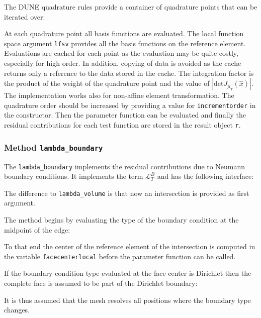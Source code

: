 \documentclass[a4paper,12pt]{article}
\begin{document}
The DUNE quadrature rules provide a container of quadrature points that
can be iterated over:

At each quadrature point all basis functions are evaluated. The local
function space argument \lstinline{lfsv} provides all the basis functions on the
reference element. Evaluations are cached for each point as the evaluation
may be quite costly, especially for high order. In addition, copying of data is
avoided as the cache returns only a reference to the data stored in the cache.
The integration factor is the product of the weight of the quadrature point
and the value of $|\text{det} J_{\mu_T}(\hat x)|$. The implementation works also
for non-affine element transformation. The quadrature order should be increased
by providing a value for \lstinline{incrementorder} in the constructor.
Then the parameter function can be evaluated and finally the
residual contributions for each test function are stored in the result object \lstinline{r}.

\subsubsection*{Method \lstinline{lambda_boundary}}

The \lstinline{lambda_boundary} implements the residual
contributions due to Neumann boundary conditions.
It implements the term $\mathcal{L}_T^B$ and has the following interface:

The difference to \lstinline{lambda_volume} is that now an intersection is
provided as first argument.

The method begins by evaluating the type of the boundary condition at the
midpoint of the edge:

To that end the center of the reference element of the intersection
is computed in the variable \lstinline{facecenterlocal} before the parameter function
can be called.

If the boundary condition type evaluated at the face center is Dirichlet
then the complete face is assumed to be part of the Dirichlet boundary:

It is thus assumed that the mesh resolves all positions where the boundary type
changes.
\end{document}
